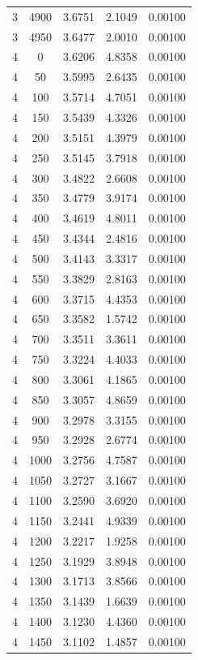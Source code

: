 \begin{longtable}{ccccc}
    3 & 4900 & 3.6751 & 2.1049 & 0.00100 \\
    3 & 4950 & 3.6477 & 2.0010 & 0.00100 \\
    4 & 0 & 3.6206 & 4.8358 & 0.00100 \\
    4 & 50 & 3.5995 & 2.6435 & 0.00100 \\
    4 & 100 & 3.5714 & 4.7051 & 0.00100 \\
    4 & 150 & 3.5439 & 4.3326 & 0.00100 \\
    4 & 200 & 3.5151 & 4.3979 & 0.00100 \\
    4 & 250 & 3.5145 & 3.7918 & 0.00100 \\
    4 & 300 & 3.4822 & 2.6608 & 0.00100 \\
    4 & 350 & 3.4779 & 3.9174 & 0.00100 \\
    4 & 400 & 3.4619 & 4.8011 & 0.00100 \\
    4 & 450 & 3.4344 & 2.4816 & 0.00100 \\
    4 & 500 & 3.4143 & 3.3317 & 0.00100 \\
    4 & 550 & 3.3829 & 2.8163 & 0.00100 \\
    4 & 600 & 3.3715 & 4.4353 & 0.00100 \\
    4 & 650 & 3.3582 & 1.5742 & 0.00100 \\
    4 & 700 & 3.3511 & 3.3611 & 0.00100 \\
    4 & 750 & 3.3224 & 4.4033 & 0.00100 \\
    4 & 800 & 3.3061 & 4.1865 & 0.00100 \\
    4 & 850 & 3.3057 & 4.8659 & 0.00100 \\
    4 & 900 & 3.2978 & 3.3155 & 0.00100 \\
    4 & 950 & 3.2928 & 2.6774 & 0.00100 \\
    4 & 1000 & 3.2756 & 4.7587 & 0.00100 \\
    4 & 1050 & 3.2727 & 3.1667 & 0.00100 \\
    4 & 1100 & 3.2590 & 3.6920 & 0.00100 \\
    4 & 1150 & 3.2441 & 4.9339 & 0.00100 \\
    4 & 1200 & 3.2217 & 1.9258 & 0.00100 \\
    4 & 1250 & 3.1929 & 3.8948 & 0.00100 \\
    4 & 1300 & 3.1713 & 3.8566 & 0.00100 \\
    4 & 1350 & 3.1439 & 1.6639 & 0.00100 \\
    4 & 1400 & 3.1230 & 4.4360 & 0.00100 \\
    4 & 1450 & 3.1102 & 1.4857 & 0.00100 \\

\end{longtable}
